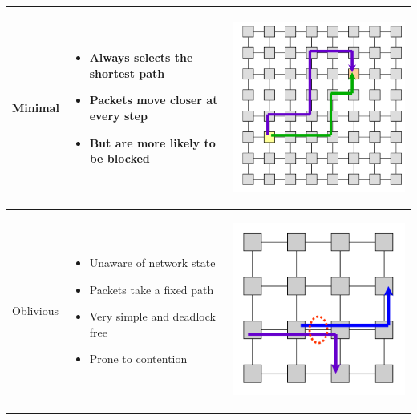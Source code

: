 \begin{center}
  \begin{tabular}{| m{2cm} | m{5cm} | c |}
    \hline
    Minimal &
    \begin{itemize}
      \item Always selects the shortest path
      \item Packets move closer at every step
      \item But are more likely to be blocked
    \end{itemize} & 
    \begin{minipage}{.3\textwidth}
      \begin{center}
        \includegraphics[width=0.5\linewidth]{images/minimal}
      \end{center}
    \end{minipage} \\ \hline
    Oblivious &
    \begin{itemize}
      \item Unaware of network state
      \item Packets take a fixed path
      \item Very simple and deadlock free
      \item Prone to contention
    \end{itemize} & 
    \begin{minipage}{.3\textwidth}
      \begin{center}
        \includegraphics[width=0.5\linewidth]{images/oblivious}

\end{center}
\end{minipage}
\end{tabular}
\end{center}
